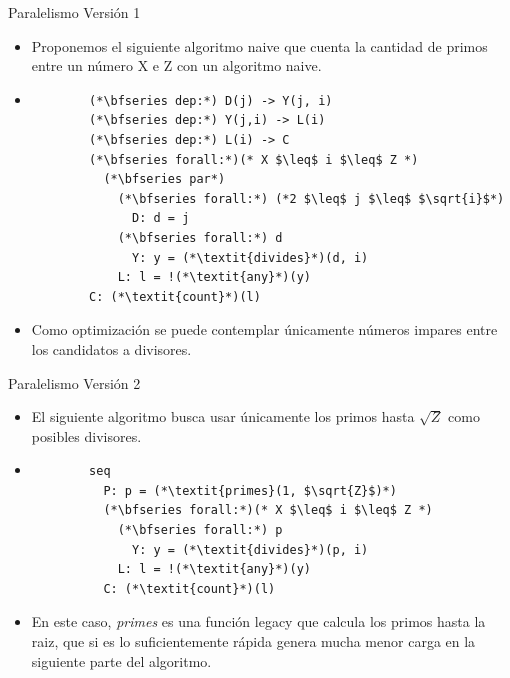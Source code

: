 \documentclass[compress]{beamer}
\begin{document}
\begin{frame}[fragile]{Paralelismo Versión 1}
  \begin{itemize}
    \setlength\itemsep{1em}
    \item<1-> Proponemos el siguiente algoritmo naive que cuenta la cantidad de primos entre un número X e Z con un algoritmo naive.
    \item<2->
     \begin{lstlisting}
        (*\bfseries dep:*) D(j) -> Y(j, i)
        (*\bfseries dep:*) Y(j,i) -> L(i)
        (*\bfseries dep:*) L(i) -> C
        (*\bfseries forall:*)(* X $\leq$ i $\leq$ Z *) 
          (*\bfseries par*)
            (*\bfseries forall:*) (*2 $\leq$ j $\leq$ $\sqrt{i}$*)
              D: d = j  
            (*\bfseries forall:*) d
              Y: y = (*\textit{divides}*)(d, i)
            L: l = !(*\textit{any}*)(y)
        C: (*\textit{count}*)(l)
    \end{lstlisting}  
    \item<3-> Como optimización se puede contemplar únicamente números impares entre los candidatos a divisores.        
  \end{itemize}
\end{frame}


\begin{frame}[fragile]{Paralelismo Versión 2}
  \begin{itemize}
    \setlength\itemsep{1em}
    \item<1-> El siguiente algoritmo busca usar únicamente los primos hasta $\sqrt{Z}$ como posibles divisores.
    \item<2->
     \begin{lstlisting}
        seq
          P: p = (*\textit{primes}(1, $\sqrt{Z}$)*)
          (*\bfseries forall:*)(* X $\leq$ i $\leq$ Z *) 
            (*\bfseries forall:*) p
              Y: y = (*\textit{divides}*)(p, i)
            L: l = !(*\textit{any}*)(y)
          C: (*\textit{count}*)(l)
    \end{lstlisting}
    \item<3-> En este caso, \textit{primes} es una función legacy que calcula los primos hasta la raiz, que si es lo suficientemente rápida genera mucha menor carga en la siguiente parte del algoritmo.          
  \end{itemize}
\end{frame}
\end{document}
